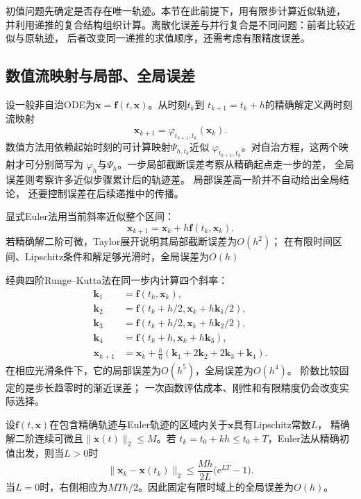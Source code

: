 初值问题先确定是否存在唯一轨迹。本节在此前提下，用有限步计算近似轨迹，
并利用递推的复合结构组织计算。离散化误差与并行复合是不同问题：前者比较近似与原轨迹，
后者改变同一递推的求值顺序，还需考虑有限精度误差。

\subsection{数值流映射与局部、全局误差}

设一般非自治ODE为$\dot{\bm{x}}=\bm{f}(t,\bm{x})$。从时刻$t_k$到
$t_{k+1}=t_k+h$的精确解定义两时刻流映射
\[
	\bm{x}_{k+1}=\varphi_{t_{k+1},t_k}(\bm{x}_k).
\]
数值方法用依赖起始时刻的可计算映射$\Psi_{h,t_k}$近似
$\varphi_{t_{k+1},t_k}$。对自治方程，这两个映射才可分别简写为
$\varphi_h$与$\Psi_h$。一步局部截断误差考察从精确起点走一步的差，
全局误差则考察许多近似步骤累计后的轨迹差。 局部误差高一阶并不自动给出全局结论，
还要控制误差在后续递推中的传播。

显式Euler法用当前斜率近似整个区间：
\begin{equation}
	\bm{x}_{k+1}= \bm{x}_{k}+h\bm{f}(t_{k},\bm{x}_{k}). \label{eq:dynamical-forward-euler}
\end{equation}
若精确解二阶可微，Taylor展开说明其局部截断误差为$O(h^{2})$； 在有限时间区间、Lipschitz条件和解足够光滑时，全局误差为$O
(h)$

经典四阶Runge--Kutta法在同一步内计算四个斜率：
\begin{align*}
	\bm{k}_{1}   & =\bm{f}(t_{k},\bm{x}_{k}),                                                \\
	\bm{k}_{2}   & =\bm{f}(t_{k}+h/2,\bm{x}_{k}+h\bm{k}_{1}/2),                              \\
	\bm{k}_{3}   & =\bm{f}(t_{k}+h/2,\bm{x}_{k}+h\bm{k}_{2}/2),                              \\
	\bm{k}_{4}   & =\bm{f}(t_{k}+h,\bm{x}_{k}+h\bm{k}_{3}),                                  \\
	\bm{x}_{k+1} & = \bm{x}_{k}+ \frac{h}{6}(\bm{k}_{1}+2\bm{k}_{2}+2\bm{k}_{3}+\bm{k}_{4}).
\end{align*}
在相应光滑条件下，它的局部误差为$O(h^{5})$，全局误差为$O(h^{4})$。 阶数比较固定的是步长趋零时的渐近误差；
一次函数评估成本、刚性和有限精度仍会改变实际选择。

\begin{theorem}[Euler法的有限时域全局误差]
	\label{thm:dynamical-euler-global-error}
	设$\bm{f}(t,\bm{x})$在包含精确轨迹与Euler轨迹的区域内关于$\bm{x}$具有Lipschitz常数$L$，
	精确解二阶连续可微且$\lVert\ddot{\bm{x}}(t)\rVert_2\leq M$。若
	$t_k=t_0+kh\leq t_0+T$，Euler法从精确初值出发，则当$L>0$时
	\[
		\lVert\bm{x}_k-\bm{x}(t_k)\rVert_2
		\leq \frac{Mh}{2L}\bigl(\mathrm{e}^{LT}-1\bigr).
	\]
	当$L=0$时，右侧相应为$MTh/2$。因此固定有限时域上的全局误差为$O(h)$。
\end{theorem}

